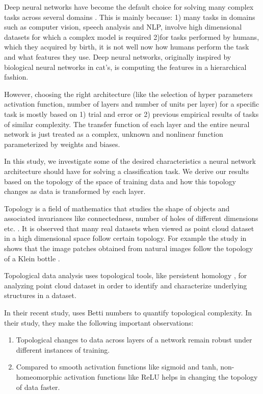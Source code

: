 \documentclass[wcp]{jmlr}
\begin{document}
Deep neural networks have become the default choice for solving many  complex tasks across several domains \cite{alexnet, yolo, chen2017deeplab, ronneberger2015u}. This is mainly because: 1) many tasks in domains such as computer vision, speech analysis and NLP, involve high dimensional datasets for which a complex model is required 2)for tasks performed by humans, which they acquired by birth, it is not well now how humans perform the task and what features they use. Deep neural networks, originally inspired by biological neural networks in cat’s, is computing the features in a hierarchical fashion.

However, choosing the right architecture (like the  selection  of hyper parameters activation function, number of layers and number of units per layer)  for a specific task is mostly based on 1) trial and error or 2) previous empirical results of tasks of similar complexity. The transfer function of each layer and the entire neural network is just treated as a complex, unknown and nonlinear function parameterized by weights and biases.

In this study,  we investigate some of the  desired characteristics a neural network architecture should have for solving a classification task. We derive our results based on the topology of the space of training data and how this topology changes as data is transformed by each layer.

Topology is a field of mathematics that studies the shape of objects and associated invariances like connectedness, number of holes of different dimensions etc. \cite{betti_number}. It is observed that many real datasets when viewed as point cloud dataset in a high dimensional space follow  certain topology. For example the study  in \cite{carlsson2009topology} shows that the image patches obtained from natural images follow the topology of a Klein bottle \cite{klein_bottle}.

Topological data analysis\cite{carlsson2009topology, chazal2021introduction} uses topological tools, like persistent homology \cite{edelsbrunner2008persistent}, for analyzing point cloud dataset in order to identify and characterize underlying structures in a dataset.

In their recent study, \cite{naitzat2020topology}  uses Betti numbers \cite{betti_number} to quantify topological complexity. In their study, they make the following important observations:

\begin{enumerate}
\item Topological changes to data across layers of a network remain robust under different instances of training.
\item Compared to smooth activation functions like sigmoid and tanh, non-homeomorphic activation functions like ReLU helps in changing the topology of data faster.
\end{enumerate}
\end{document}
